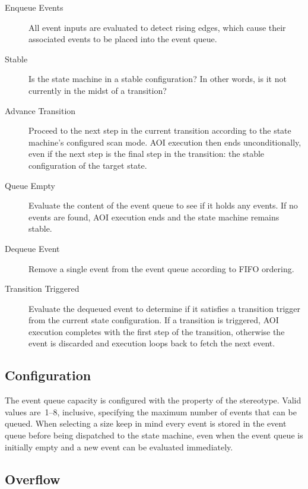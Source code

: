 \begin{description}
  \item[Enqueue Events] All event inputs are evaluated to detect rising
    edges, which cause their associated events to be placed into the
    event queue.

  \item[Stable] Is the state machine in a stable configuration? In other
    words, is it not currently in the midst of a transition?

  \item[Advance Transition] Proceed to the next step in the current
    transition according to the state machine's configured scan mode.
    AOI execution then ends unconditionally, even if the next step is the
    final step in the transition: the stable configuration of the
    target state.

  \item[Queue Empty] Evaluate the content of the event queue to see if it
    holds any events. If no events are found, AOI execution ends and the
    state machine remains stable.

  \item[Dequeue Event] Remove a single event from the event queue according
    to FIFO ordering.

  \item[Transition Triggered] Evaluate the dequeued event to determine if it
    satisfies a transition trigger from the current state configuration.
    If a transition is triggered, AOI execution completes with the
    first step of the transition, otherwise the event is discarded and
    execution loops back to fetch the next event.
\end{description}




\subsection{Configuration}

The event queue capacity is configured with the
 property of the
\identifier{\stereotypeName} stereotype. Valid values are~1--8,
inclusive, specifying the maximum number of events that can be queued.
When selecting a size keep in mind every event is stored in
the event queue before being dispatched to the state machine,
even when the event queue is initially empty and a new event can be
evaluated immediately.


\subsection{Overflow}

